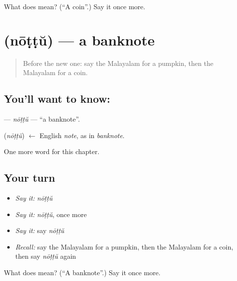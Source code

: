 \begin{tcolorbox}[breakable,colback=teal!4,colframe=teal!35!black,title={Before you move on}]
What does  mean? (\textquotedblleft{}A coin\textquotedblright{}.) Say it once more.
\end{tcolorbox}
\section[\texorpdfstring{\ml{നോട്ട്} (nōṭṭŭ)}{നോട്ട് (nōṭṭŭ)}]{ (nōṭṭŭ) — a banknote}

\label{lesson:ML-C219-nottu}



\begin{quote}
Before the new one: say the Malayalam for a pumpkin, then the Malayalam for a coin.
\end{quote}

\subsection*{You'll want to know: }
\textbf{} — \emph{nōṭṭŭ} — \textquotedblleft{}a banknote\textquotedblright{}.

\begin{cousinweb}
\textbf{} (\emph{nōṭṭŭ}) $\leftarrow$ English \emph{note}, as in \emph{banknote}.
\end{cousinweb}

\begin{grammarlens}[title={What you've built}]
One more word for this chapter.
\end{grammarlens}

\subsection*{Your turn}
\begin{itemize}
\raggedright
  \item \emph{Say it:} \emph{nōṭṭŭ}
  \item \emph{Say it:} \emph{nōṭṭŭ}, once more
  \item \emph{Say it:} say \emph{nōṭṭŭ}
  \item \emph{Recall:} say the Malayalam for a pumpkin, then the Malayalam for a coin, then say \emph{nōṭṭŭ} again
\end{itemize}

\begin{tcolorbox}[breakable,colback=teal!4,colframe=teal!35!black,title={Before you move on}]
What does  mean? (\textquotedblleft{}A banknote\textquotedblright{}.) Say it once more.
\end{tcolorbox}
